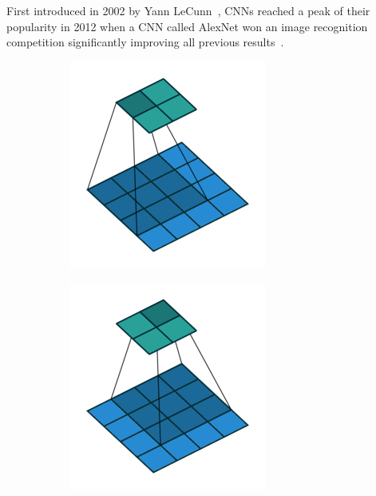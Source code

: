 First introduced in 2002 by Yann LeCunn~\cite{lecun}, CNNs reached a peak of their popularity in 2012 when a CNN called AlexNet won an image recognition competition significantly improving all previous results~\cite{alexnet}. 


\begin{figure}[h]
  \begin{subfigure}[b]{0.24\textwidth}
    \includegraphics[width=\textwidth]{figures/no_padding_no_strides_00}
  \end{subfigure}
  \begin{subfigure}[b]{0.24\textwidth}
    \includegraphics[width=\textwidth]{figures/no_padding_no_strides_01}

\end{subfigure}
\end{figure}
